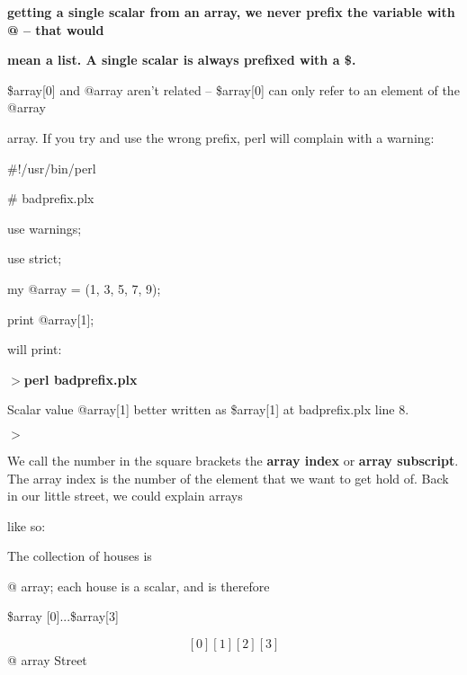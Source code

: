 \documentclass[a4paper,11pt]{book}
\begin{document}
\noindent \textbf{getting a single scalar from an array, we never prefix the variable with @ -- that would}

\noindent \textbf{mean a list. A single scalar is always prefixed with a \$.}

\noindent 

\noindent 

\noindent \$array[0] and @array aren't related -- \$array[0] can only refer to an element of the @array

\noindent array. If you try and use the wrong prefix, perl will complain with a warning:

\noindent 

\noindent \#!/usr/bin/perl

\noindent \# badprefix.plx

\noindent use warnings;

\noindent use strict;

\noindent 

\noindent my @array = (1, 3, 5, 7, 9);

\noindent print @array[1];

\noindent 

\noindent will print:

\noindent 

\noindent $>$\textbf{perl badprefix.plx}

\noindent Scalar value @array[1] better written as \$array[1] at badprefix.plx line 8.

$>$

\noindent 

\noindent We call the number in the square brackets the \textbf{array index }or \textbf{array subscript}. The array index is the number of the element that we want to get hold of. Back in our little street, we could explain arrays

\noindent like so:

\noindent 

\noindent 

\noindent The collection of houses is

\noindent @ array; each house is a scalar, and is therefore

\noindent \$array [0]...\$array[3]

\noindent 

\noindent 

\[[0] [1] [2] [3]\] 
@ array Street

\noindent 

\noindent 
\end{document}
